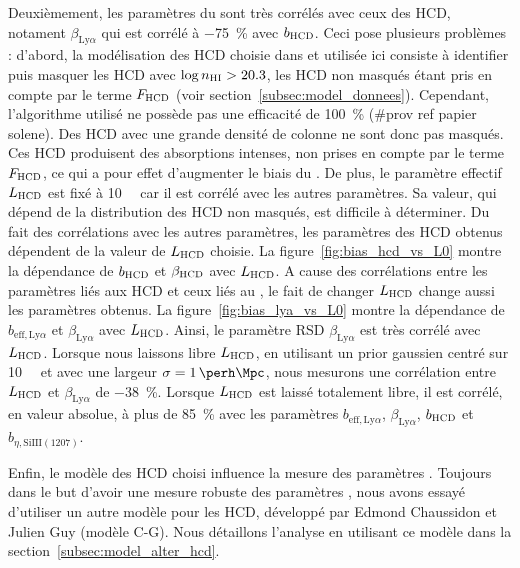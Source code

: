 \documentclass[11pt, twoside, a4paper, openright]{report}
\begin{document}
Deuxièmement, les paramètres du \lya{} sont très corrélés avec ceux des HCD, notament $\beta_{\mathrm{Ly}\alpha}$ qui est corrélé à \SI{-75}{\percent} avec $b_{\textsc{HCD}}$. Ceci pose plusieurs problèmes : d'abord, la modélisation des HCD choisie dans \textcite{prov} et utilisée ici consiste à identifier puis masquer les HCD avec $\log n_{\textsc{HI}} > \num{20.3}$, les HCD non masqués étant pris en compte par le terme $F_{\textsc{HCD}}$ (voir section~\ref{subsec:model_donnees}). Cependant, l'algorithme utilisé ne possède pas une efficacité de \SI{100}{\percent} (\#prov ref papier solene). Des HCD avec une grande densité de colonne ne sont donc pas masqués.
Ces HCD produisent des absorptions intenses, non prises en compte par le terme $F_{\textsc{HCD}}$, ce qui a pour effet d'augmenter le biais du \lya{}.
De plus, le paramètre effectif $L_{\textsc{HCD}}$ est fixé à \SI{10}{\perh\Mpc} car il est corrélé avec les autres paramètres.
Sa valeur, qui dépend de la distribution des HCD non masqués, est difficile à déterminer.
Du fait des corrélations avec les autres paramètres, les paramètres des HCD obtenus dépendent de la valeur de $L_{\textsc{HCD}}$ choisie.
La figure~\ref{fig:bias_hcd_vs_L0} montre la dépendance de $b_{\textsc{HCD}}$ et $\beta_{\textsc{HCD}}$ avec $L_{\textsc{HCD}}$.
A cause des corrélations entre les paramètres liés aux HCD et ceux liés au \lya{}, le fait de changer $L_{\textsc{HCD}}$ change aussi les paramètres \lya{} obtenus.
La figure~\ref{fig:bias_lya_vs_L0} montre la dépendance de $b_{\mathrm{eff},\mathrm{Ly}\alpha}$ et $\beta_{\mathrm{Ly}\alpha}$ avec $L_{\textsc{HCD}}$. Ainsi, le paramètre RSD $\beta_{\mathrm{Ly}\alpha}$ est très corrélé avec $L_{\textsc{HCD}}$. Lorsque nous laissons libre $L_{\textsc{HCD}}$, en utilisant un prior gaussien centré sur \SI{10}{\perh\Mpc} et avec une largeur $\sigma = \SI{1}{\perh\Mpc}$, nous mesurons une corrélation entre $L_{\textsc{HCD}}$ et $\beta_{\mathrm{Ly}\alpha}$ de \SI{-38}{\percent}. Lorsque $L_{\textsc{HCD}}$ est laissé totalement libre, il est corrélé, en valeur absolue, à plus de \SI{85}{\percent} avec les paramètres $b_{\mathrm{eff},\mathrm{Ly}\alpha}$, $\beta_{\mathrm{Ly}\alpha}$, $b_{\textsc{HCD}}$ et $b_{\eta, \mathrm{SiIII}(1207)}$.

Enfin, le modèle des HCD choisi influence la mesure des paramètres \lya{}. Toujours dans le but d'avoir une mesure robuste des paramètres \lya{}, nous avons essayé d'utiliser un autre modèle pour les HCD, développé par Edmond Chaussidon et Julien Guy (modèle C-G). Nous détaillons l'analyse en utilisant ce modèle dans la section~\ref{subsec:model_alter_hcd}.
\end{document}
